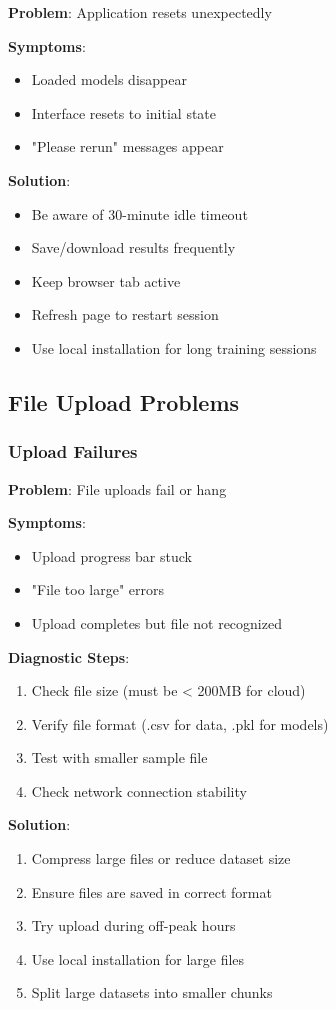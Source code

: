\textbf{Problem}: Application resets unexpectedly

\textbf{Symptoms}:
\begin{itemize}
	\item Loaded models disappear
	\item Interface resets to initial state
	\item "Please rerun" messages appear
\end{itemize}

\textbf{Solution}:
\begin{itemize}
	\item Be aware of 30-minute idle timeout
	\item Save/download results frequently
	\item Keep browser tab active
	\item Refresh page to restart session
	\item Use local installation for long training sessions
\end{itemize}

\subsection{File Upload Problems}

\subsubsection{Upload Failures}

\textbf{Problem}: File uploads fail or hang

\textbf{Symptoms}:
\begin{itemize}
	\item Upload progress bar stuck
	\item "File too large" errors
	\item Upload completes but file not recognized
\end{itemize}

\textbf{Diagnostic Steps}:
\begin{enumerate}
	\item Check file size (must be < 200MB for cloud)
	\item Verify file format (.csv for data, .pkl for models)
	\item Test with smaller sample file
	\item Check network connection stability
\end{enumerate}

\textbf{Solution}:
\begin{enumerate}
	\item Compress large files or reduce dataset size
	\item Ensure files are saved in correct format
	\item Try upload during off-peak hours
	\item Use local installation for large files
	\item Split large datasets into smaller chunks
\end{enumerate}

